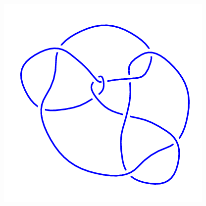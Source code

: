 \begin{figure}[H]
\begin{minipage}[b]{.18\linewidth}
    \end{minipage}
    \begin{minipage}[b]{.18\linewidth}
        \centering
        \includegraphics[width=\linewidth]{../data/10_151.png}
    \end{minipage}
\end{figure}
